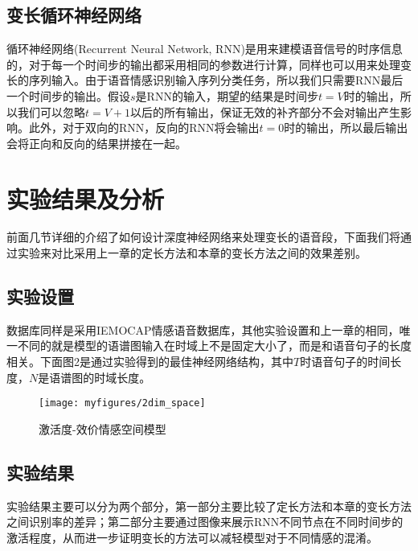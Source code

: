 \subsection{变长循环神经网络}
\label{ssec:var_len_rnn}

循环神经网络(Recurrent Neural Network, RNN)是用来建模语音信号的时序信息的，对于每一个时间步的输出都采用相同的参数进行计算，同样也可以用来处理变长的序列输入。由于语音情感识别输入序列分类任务，所以我们只需要RNN最后一个时间步的输出。假设$s$是RNN的输入，期望的结果是时间步$t=V$时的输出，所以我们可以忽略$t=V+1$以后的所有输出，保证无效的补齐部分不会对输出产生影响。此外，对于双向的RNN，反向的RNN将会输出$t=0$时的输出，所以最后输出会将正向和反向的结果拼接在一起。

\section{实验结果及分析}
\label{sec:var_len_experiment}

前面几节详细的介绍了如何设计深度神经网络来处理变长的语音段，下面我们将通过实验来对比采用上一章的定长方法和本章的变长方法之间的效果差别。

\subsection{实验设置}
\label{sec:var_len_experiement_setup}

数据库同样是采用IEMOCAP情感语音数据库，其他实验设置和上一章的相同，唯一不同的就是模型的语谱图输入在时域上不是固定大小了，而是和语音句子的长度相关。下面图2是通过实验得到的最佳神经网络结构，其中$T$时语音句子的时间长度，$N$是语谱图的时域长度。

\begin{figure}[H] %
    \centering
    \texttt{[image: myfigures/2dim\_space]}
    \caption{激活度-效价情感空间模型}
    \label{fig:xfig1}
\end{figure}

\subsection{实验结果}
\label{sec:var_len_experiement_result}

实验结果主要可以分为两个部分，第一部分主要比较了定长方法和本章的变长方法之间识别率的差异；第二部分主要通过图像来展示RNN不同节点在不同时间步的激活程度，从而进一步证明变长的方法可以减轻模型对于不同情感的混淆。

